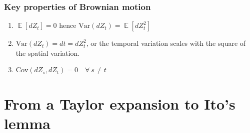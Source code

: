 \documentclass[12pt]{article}
\DeclareMathOperator*{\E}{\mathbb{E}}
\begin{document}
\subsubsection{Key properties of Brownian motion} \label{KeyProperties_BrownianMotion}
\begin{enumerate}
	\item $\E\left[dZ_t\right]=0$ hence $\mathrm{Var}(dZ_t)=\E\left[dZ_t^2\right]$
	\item $\mathrm{Var}(dZ_t)=dt=dZ_t^2$, or the temporal variation scales with the square of the spatial variation. \label{dZVsdt}
	\item $\mathrm{Cov}(dZ_s,dZ_t)=0\quad\forall\: s\not=t$
\end{enumerate}








\section{From a Taylor expansion to Ito's lemma}
\end{document}
